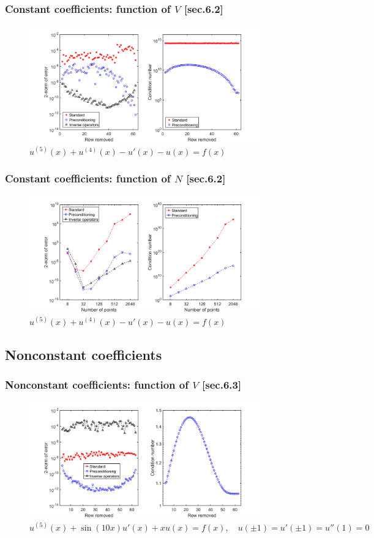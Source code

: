 \documentclass{beamer}
\begin{document}
\begin{frame}
\frametitle{Constant coefficients: function of $V$ [sec.6.2] }
\begin{figure}
\includegraphics[width=0.9\textwidth]{example_5thCC_V.png}
\caption{$u^{(5)}(x) + u^{(4)}(x) - u'(x) - u(x) = f(x)$}
\end{figure}
\end{frame}

\begin{frame}
\frametitle{Constant coefficients: function of $N$ [sec.6.2]}
\begin{figure}
\includegraphics[width=0.9\textwidth]{example_5thCC_N.png}
\caption{ $u^{(5)}(x) + u^{(4)}(x) - u'(x) - u(x) = f(x)$}
\end{figure}
\end{frame}

\subsection{Nonconstant coefficients}

\begin{frame}
\frametitle{Nonconstant coefficients: function of $V$ [sec.6.3]}
\begin{figure}
\includegraphics[width=0.9\textwidth]{example_Wang5th_V64.png}
\caption{ $u^{(5)}(x) + \sin(10x) u'(x) + x u(x) = f(x), \quad u(\pm 1) = u'(\pm 1) = u''(1) = 0$}
\end{figure}
\end{frame}
\end{document}
